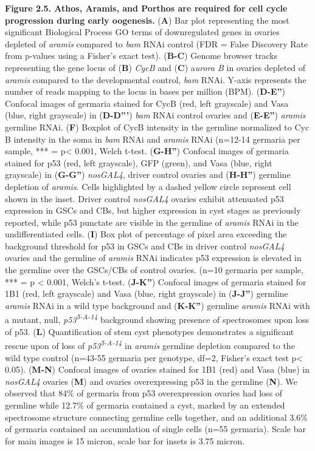 \documentclass[12pt,oneside]{reedthesis}
\begin{document}
\textbf{Figure 2.5. Athos, Aramis, and Porthos are required for cell cycle
progression during early oogenesis.} (\textbf{A}) Bar plot representing the
most significant Biological Process GO terms of downregulated genes in
ovaries depleted of \emph{aramis} compared to \emph{bam} RNAi control (FDR = False
Discovery Rate from p-values using a Fisher's exact test). (\textbf{B-C})
Genome browser tracks representing the gene locus of (\textbf{B}) \emph{CycB} and
(\textbf{C}) a\emph{urora B} in ovaries depleted of \emph{aramis} compared to the
developmental control, \emph{bam} RNAi. Y-axis represents the number of reads
mapping to the locus in bases per million (BPM). (\textbf{D-E''}) Confocal
images of germaria stained for CycB (red, left grayscale) and Vasa
(blue, right grayscale) in (\textbf{D-D'''}) \emph{bam} RNAi control ovaries and
(\textbf{E-E''}) \emph{aramis} germline RNAi. (\textbf{F}) Boxplot of CycB intensity in
the germline normalized to Cyc B intensity in the soma in \emph{bam} RNAi and
\emph{aramis} RNAi (n=12-14 germaria per sample, *** = p\textless{} 0.001, Welch
t-test. (\textbf{G-H''}) Confocal images of germaria stained for p53 (red,
left grayscale), GFP (green), and Vasa (blue, right grayscale) in
(\textbf{G-G''}) \emph{nosGAL4}, driver control ovaries and (\textbf{H-H''}) germline
depletion of \emph{aramis}. Cells highlighted by a dashed yellow circle
represent cell shown in the inset. Driver control \emph{nosGAL4} ovaries
exhibit attenuated p53 expression in GSCs and CBs, but higher expression
in cyst stages as previously reported, while p53 punctate are visible in
the germline of \emph{aramis} RNAi in the undifferentiated cells. (\textbf{I}) Box
plot of percentage of pixel area exceeding the background threshold for
p53 in GSCs and CBs in driver control \emph{nosGAL4} ovaries and the germline
of \emph{aramis} RNAi indicates p53 expression is elevated in the germline
over the GSCs/CBs of control ovaries. (n=10 germaria per sample, ***
= p \textless{} 0.001, Welch's t-test. (\textbf{J-K''}) Confocal images of germaria
stained for 1B1 (red, left grayscale) and Vasa (blue, right grayscale)
in (\textbf{J-J''}) germline \emph{aramis} RNAi in a wild type background and
(\textbf{K-K''}) germline \emph{aramis} RNAi with a mutant, null, \emph{p53\textsuperscript{5-A-14}}
background showing presence of spectrosomes upon loss of p53. (\textbf{L})
Quantification of stem cyst phenotypes demonstrates a significant rescue
upon of loss of \emph{p53\textsuperscript{5-A-14}} in \emph{aramis} germline depletion compared to
the wild type control (n=43-55 germaria per genotype, df=2, Fisher's
exact test p\textless{} 0.05). (\textbf{M-N}) Confocal images of ovaries stained for
1B1 (red) and Vasa (blue) in \emph{nosGAL4} ovaries (\textbf{M}) and ovaries
overexpressing p53 in the germline (\textbf{N}). We observed that 84\% of
germaria from p53 overexpression ovaries had loss of germline while
12.7\% of germaria contained a cyst, marked by an extended spectrosome
structure connecting germline cells together, and an additional 3.6\% of
germaria contained an accumulation of single cells (n=55 germaria).
Scale bar for main images is 15 micron, scale bar for insets is 3.75
micron.
\end{document}
